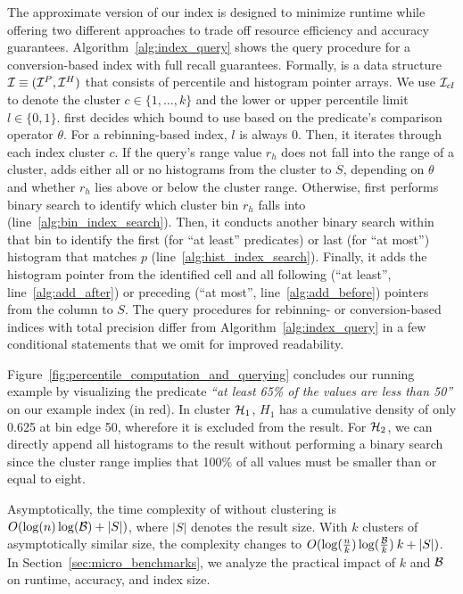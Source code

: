 The approximate version of our index is designed to minimize runtime while offering two different approaches to trade off resource efficiency and accuracy guarantees.
Algorithm~\ref{alg:index_query} shows the query procedure for a conversion-based index with full recall guarantees.
Formally, \system{} is a data structure $\mathcal{I}\equiv (\mathcal{I}^P, \mathcal{I}^H)$ that consists of percentile and histogram pointer arrays.
We use $\mathcal{I}_{cl}$ to denote the cluster $c \in \{1, \ldots, k\}$ and the lower or upper percentile limit $l \in \{0, 1\}$.
\system{} first decides which bound to use based on the predicate's comparison operator $\theta$.
For a rebinning-based index, $l$ is always 0.
Then, it iterates through each index cluster $c$.
If the query's range value $r_h$ does not fall into the range of a cluster, \system{} adds either all or no histograms from the cluster to $S$, depending on $\theta$ and whether $r_h$ lies above or below the cluster range.
Otherwise, \system{} first performs binary search to identify which cluster bin $r_h$ falls into (line~\ref{alg:bin_index_search}).
Then, it conducts another binary search within that bin to identify the first (for ``at least'' predicates) or last (for ``at most'') histogram that matches $p$ (line~\ref{alg:hist_index_search}).
Finally, it adds the histogram pointer from the identified cell and all following (``at least'', line~\ref{alg:add_after}) or preceding (``at most'', line~\ref{alg:add_before}) pointers from the column to $S$.
The query procedures for re\-bin\-ning- or con\-ver\-sion-ba\-sed indices with total precision differ from Algorithm~\ref{alg:index_query} in a few conditional statements that we omit for improved readability.

Figure~\ref{fig:percentile_computation_and_querying} concludes our running example by visualizing the predicate \textit{``at least 65\% of the values are less than 50''} on our example index (in red).
In cluster $\mathcal{H}_1$, $H_1$ has a cumulative density of only 0.625 at bin edge 50, wherefore it is excluded from the result.
For $\mathcal{H}_2$, we can directly append all histograms to the result without performing a binary search since the cluster range implies that 100\% of all values must be smaller than or equal to eight.

Asymptotically, the time complexity of \approximate{} without clustering is $O(\log(n) \log(\mathcal{B}) + |S|)$, where $|S|$ denotes the result size.
With $k$ clusters of asymptotically similar size, the complexity changes to $O(\log(\frac{n}{k}) \log(\frac{\mathcal{B}}{k}) \: k + |S|)$.
In Section~\ref{sec:micro_benchmarks}, we analyze the practical impact of $k$ and $\mathcal{B}$ on runtime, accuracy, and index size.


